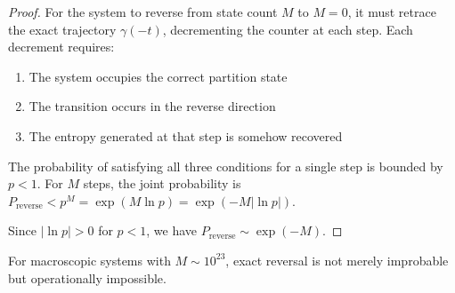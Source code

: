 \documentclass[twocolumn,10pt]{article}
\begin{document}
\begin{proof}
For the system to reverse from state count $M$ to $M = 0$, it must retrace the exact trajectory $\gamma(-t)$, decrementing the counter at each step. Each decrement requires:
\begin{enumerate}
    \item[(i)] The system occupies the correct partition state
    \item[(ii)] The transition occurs in the reverse direction
    \item[(iii)] The entropy generated at that step is somehow recovered
\end{enumerate}

The probability of satisfying all three conditions for a single step is bounded by $p < 1$. For $M$ steps, the joint probability is $P_{\mathrm{reverse}} < p^M = \exp(M \ln p) = \exp(-M |\ln p|)$.

Since $|\ln p| > 0$ for $p < 1$, we have $P_{\mathrm{reverse}} \sim \exp(-M)$.
\end{proof}

For macroscopic systems with $M \sim 10^{23}$, exact reversal is not merely improbable but operationally impossible.
\end{document}
